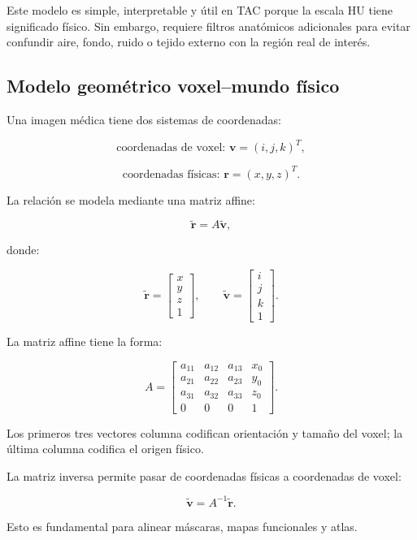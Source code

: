\documentclass[12pt,a4paper]{article}
\begin{document}
Este modelo es simple, interpretable y útil en TAC porque la escala HU tiene significado físico. Sin embargo, requiere filtros anatómicos adicionales para evitar confundir aire, fondo, ruido o tejido externo con la región real de interés.

\subsection{Modelo geométrico voxel--mundo físico}

Una imagen médica tiene dos sistemas de coordenadas:

\[
\text{coordenadas de voxel: } \mathbf{v}=(i,j,k)^T,
\]

\[
\text{coordenadas físicas: } \mathbf{r}=(x,y,z)^T.
\]

La relación se modela mediante una matriz affine:

\[
\tilde{\mathbf{r}}
=
A\tilde{\mathbf{v}},
\]

donde:

\[
\tilde{\mathbf{r}}=
\begin{bmatrix}
x\\y\\z\\1
\end{bmatrix},
\qquad
\tilde{\mathbf{v}}=
\begin{bmatrix}
i\\j\\k\\1
\end{bmatrix}.
\]

La matriz affine tiene la forma:

\[
A=
\begin{bmatrix}
a_{11} & a_{12} & a_{13} & x_0\\
a_{21} & a_{22} & a_{23} & y_0\\
a_{31} & a_{32} & a_{33} & z_0\\
0 & 0 & 0 & 1
\end{bmatrix}.
\]

Los primeros tres vectores columna codifican orientación y tamaño del voxel; la última columna codifica el origen físico.

La matriz inversa permite pasar de coordenadas físicas a coordenadas de voxel:

\[
\tilde{\mathbf{v}}
=
A^{-1}
\tilde{\mathbf{r}}.
\]

Esto es fundamental para alinear máscaras, mapas funcionales y atlas.
\end{document}
